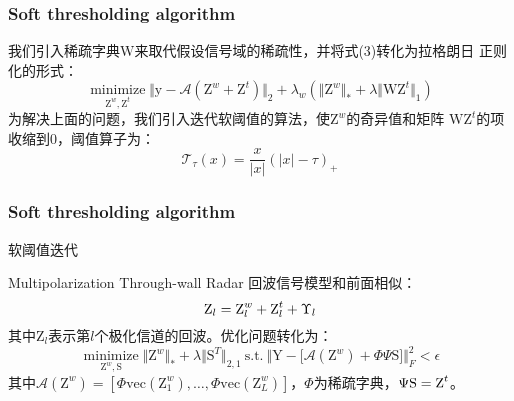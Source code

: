 \documentclass[12pt]{beamer}
\begin{document}
\begin{frame}
  \frametitle{Soft thresholding algorithm}
  我们引入稀疏字典$\text{W}$来取代假设信号域的稀疏性，并将式(3)转化为拉格朗日
  正则化的形式：
  \begin{equation}
\mathop\text{minimize}\limits_{\text{Z}^{w},\text{Z}^{t}} \Vert \text{y}-\mathcal{A}(\text{Z}^{w}+\text{Z}^{t})\Vert_{2}+\lambda_{w}(\Vert \text{Z}^{w}\Vert_{*}+\lambda\Vert \text{WZ}^{t}\Vert_{1})
  \end{equation}
  为解决上面的问题，我们引入迭代软阈值的算法，使$\text{Z}^w$的奇异值和矩阵
  $\text{WZ}^t$的项收缩到0，阈值算子为：
  \begin{equation*}
	\mathcal{T}_{\tau}(x)=\frac{x}{\vert x\vert }(\vert x\vert -\tau)_{+}
  \end{equation*}
\end{frame}
\begin{frame}
  \frametitle{Soft thresholding algorithm}
  \scriptsize
  \begin{algorithm}[H]  
	\caption{软阈值迭代}
	\label{alg:1}
	\begin{algorithmic}[1]
	  \ELSE
	  \ENDIF
	\end{algorithmic}
  \end{algorithm}
\end{frame}
\begin{frame}{Multipolarization Through-wall Radar}
  回波信号模型和前面相似：
  \begin{equation}
	\text{Z}_l=\text Z^{w}_l+\text{Z}_l^{t}+\Upsilon_l
  \end{equation}
  其中$\text{Z}_l$表示第$l$个极化信道的回波。优化问题转化为：
  \begin{equation}
	\mathop{\text{minimize}}\limits_{\text{Z}^{w},\text{S}} \Vert \text{Z}^{w}\Vert_{*}+\lambda\Vert \text{S}^T\Vert_{2,1}\ \text{s.t}.\ \Big\Vert \text{Y}-\big[\mathcal{A}(\text{Z}^{w})+\Phi\Psi\text{S}\big]\Big\Vert_{F}^2 < \epsilon
  \end{equation}
  其中$\mathcal A(\text{Z}^w) = [\Phi\text{vec}(\text{Z}_1^w),\dots,\Phi\text{vec}(\text{Z}_L^w)] $，$\Phi$为稀疏字典，$\Psi\text S = \text Z^t$。
\end{frame}
\end{document}
